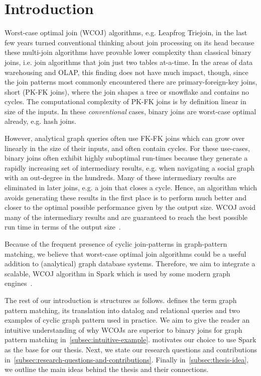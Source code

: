 \section{Introduction} \label{sec:introduction}
Worst-case optimal join (WCOJ) algorithms, e.g. Leapfrog Triejoin, in the last few years turned conventional thinking about join processing
on its head because these multi-join algorithms have provable lower complexity than classical binary joins,
i.e. join algorithms that join just two tables at-a-time.
In the areas of data warehousing and OLAP, this finding does not have much impact, though,
since the join patterns most commonly encountered there are primary-foreign-key joins, short (PK-FK joins),
where the join shapes a tree or snowflake and contains no cycles.
The computational complexity of PK-FK joins is by definition linear in size of the inputs.
In these \textit{conventional} cases, binary joins are worst-case optimal already, e.g. hash joins.

However, analytical graph queries often use FK-FK joins which can grow over linearly in the size of their inputs,
and often contain cycles.
For these use-cases, binary joins often exhibit highly suboptimal run-times because they generate a rapidly increasing set of
intermediary results, e.g. when navigating a social graph with an out-degree in the hundreds.
Many of these intermediary results are eliminated in later joins, e.g. a join that closes a cycle.
Hence, an algorithm which avoids generating these results in the first place is to perform much better and
closer to the optimal possible performance given by the output size.
\textsc{WCOJ} avoid many of the intermediary results and are guaranteed to reach the best possible run time in terms of
the output size~\cite{agm}.

Because of the frequent presence of cyclic join-patterns in graph-pattern matching, we believe that worst-case optimal join algorithms
could be a useful addition to (analytical) graph database systems.
Therefore, we aim to integrate a scalable, \textsc{WCOJ} algorithm in Spark which is used by some modern graph engines~\cite{caps,gcore,
graphframe}.

The rest of our introduction is structures as follows.
 defines the term graph pattern matching, its translation into datalog and
relational queries and two examples of cyclic graph pattern used in practice.
We aim to give the reader an intuitive understanding of why \textsc{WCOJ}s are superior to binary joins for graph pattern matching
in~\cref{subsec:intuitive-example}.
 motivates our choice to use Spark as the base for our thesis.
Next, we state our research questions and contributions in~\cref{subsec:research-questions-and-contributions}.
Finally in~\cref{subsec:thesis-idea}, we outline the main ideas behind the thesis and their connections.

